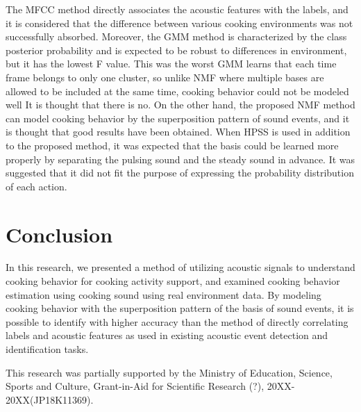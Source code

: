 \documentclass[sigchi]{acmart}
\begin{document}
The MFCC method directly associates the acoustic features with the labels, and it is considered that the difference between various cooking environments was not successfully absorbed.
Moreover, the GMM method is characterized by the class posterior probability and is expected to be robust to differences in environment, but it has the lowest F value. This was the worst%
GMM learns that each time frame belongs to only one cluster, so unlike NMF where multiple bases are allowed to be included at the same time, cooking behavior could not be modeled well It is thought that there is no.
On the other hand, the proposed NMF method can model cooking behavior by the superposition pattern of sound events, and it is thought that good results have been obtained.
When HPSS is used in addition to the proposed method, it was expected that the basis could be learned more properly by separating the pulsing sound and the steady sound in advance. It was suggested that it did not fit the purpose of expressing the probability distribution of each action.

\section{Conclusion}
In this research, we presented a method of utilizing acoustic signals to understand cooking behavior for cooking activity support, and examined cooking behavior estimation using cooking sound using real environment data.
By modeling cooking behavior with the superposition pattern of the basis of sound events, it is possible to identify with higher accuracy than the method of directly correlating labels and acoustic features as used in existing acoustic event detection and identification tasks.

%
\begin{acks}
This research was partially supported by the Ministry of Education, Science, Sports and Culture, Grant-in-Aid for Scientific Research (?), 20XX-20XX(JP18K11369).
\end{acks}

%



%
\end{document}
